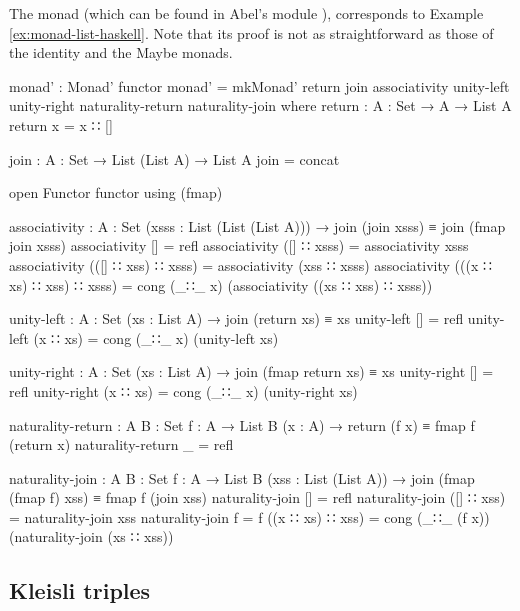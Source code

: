 \begin{example}
  \label{ex:monad-list-agda}

  The  monad (which can be found in Abel's module
  ), corresponds to Example
  \ref{ex:monad-list-haskell}. Note that its proof is not as
  straightforward as those of the identity and the Maybe monads.
  \begin{codeagda}
monad' : Monad' functor
monad' = mkMonad' return join associativity unity-left unity-right
                  naturality-return naturality-join
  where
    return : {A : Set} → A → List A
    return x = x ∷ []

    join : {A : Set} → List (List A) → List A
    join = concat

    open Functor functor using (fmap)

    associativity : {A : Set} (xsss : List (List (List A))) →
                    join (join xsss) ≡ join (fmap join xsss)
    associativity []                        = refl
    associativity ([] ∷ xsss)               = associativity xsss
    associativity (([] ∷ xss) ∷ xsss)       = associativity (xss ∷ xsss)
    associativity (((x ∷ xs) ∷ xss) ∷ xsss) =
      cong (_∷_ x) (associativity ((xs ∷ xss) ∷ xsss))

    unity-left : {A : Set} (xs : List A) → join (return xs) ≡ xs
    unity-left []       = refl
    unity-left (x ∷ xs) = cong (_∷_ x) (unity-left xs)

    unity-right : {A : Set} (xs : List A) → join (fmap return xs) ≡ xs
    unity-right []       = refl
    unity-right (x ∷ xs) = cong (_∷_ x) (unity-right xs)

    naturality-return : {A B : Set} {f : A → List B} (x : A) →
                        return (f x) ≡ fmap f (return x)
    naturality-return _ = refl

    naturality-join : {A B : Set} {f : A → List B} (xss : List (List A)) →
                      join (fmap (fmap f) xss) ≡ fmap f (join xss)
    naturality-join         []               = refl
    naturality-join         ([] ∷ xss)       = naturality-join xss
    naturality-join {f = f} ((x ∷ xs) ∷ xss) =
      cong (_∷_ (f x)) (naturality-join (xs ∷ xss))
  \end{codeagda}
\end{example}

\subsection*{Kleisli triples}

